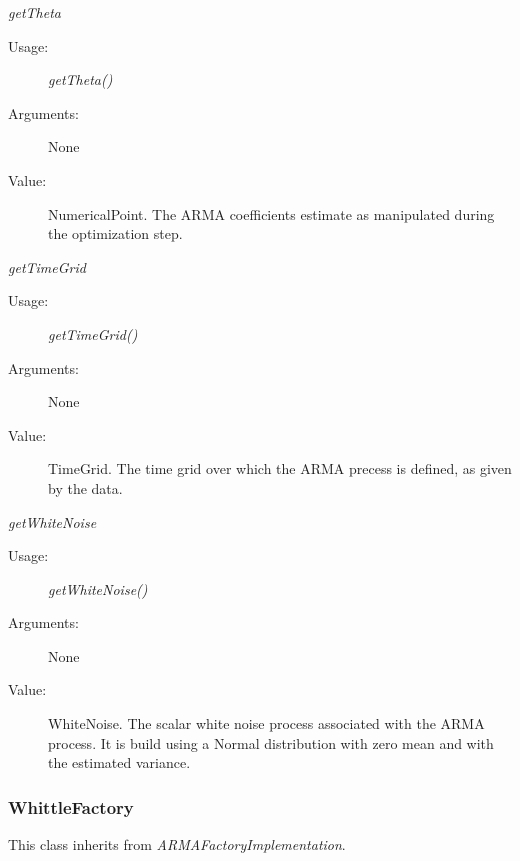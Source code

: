 \begin{description}
\begin{description}
\item \textit{getTheta}
\begin{description}
\item[Usage:] \textit{getTheta()}
\item[Arguments:] None
\item[Value:] NumericalPoint. The ARMA coefficients estimate as manipulated during the optimization step.
\end{description}
\bigskip

\item \textit{getTimeGrid}
\begin{description}
\item[Usage:] \textit{getTimeGrid()}
\item[Arguments:] None
\item[Value:] TimeGrid. The time grid over which the ARMA precess is defined, as given by the data.
\end{description}
\bigskip

\item \textit{getWhiteNoise}
\begin{description}
\item[Usage:] \textit{getWhiteNoise()}
\item[Arguments:] None
\item[Value:] WhiteNoise. The scalar white noise process associated with the ARMA process. It is build using a Normal distribution with zero mean and with the estimated variance.
\end{description}
\bigskip


\end{description}

\end{description}



\newpage
\subsubsection{WhittleFactory}

This class inherits from \textit{ARMAFactoryImplementation}.\\

